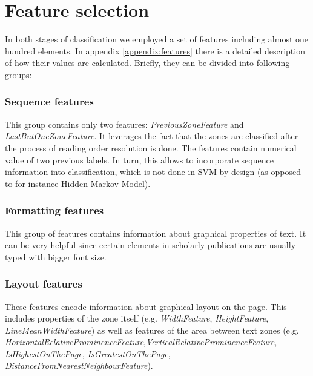 \section{Feature selection}
In both stages of classification we employed a set of features including almost one hundred elements. In appendix \ref{appendix:features} there is a detailed description of how their values are calculated. Briefly, they can be divided into following groups:

\subsubsection{Sequence features}
This group contains only two features: \textit{PreviousZoneFeature} and \textit{LastButOneZoneFeature}. It leverages the fact that the zones are classified after the process of reading order resolution is done. The features contain numerical value of two previous labels. In turn, this allows to incorporate sequence information into classification, which is not done in SVM by design (as opposed to for instance Hidden Markov Model).

\subsubsection{Formatting features}
This group of features contains information about graphical properties of text. It can be very helpful since certain elements in scholarly publications are usually typed with bigger font size.

\subsubsection{Layout features}
These features encode information about graphical layout on the page. This includes properties of the zone itself (e.g. \textit{WidthFeature}, \textit{HeightFeature}, \textit{LineMeanWidthFeature}) as well as features of the area between text zones (e.g. \textit{HorizontalRelativeProminenceFeature},\textit{VerticalRelativeProminenceFeature}, \textit{IsHighestOnThePage}, \textit{IsGreatestOnThePage}, \textit{DistanceFromNearestNeighbourFeature}).

